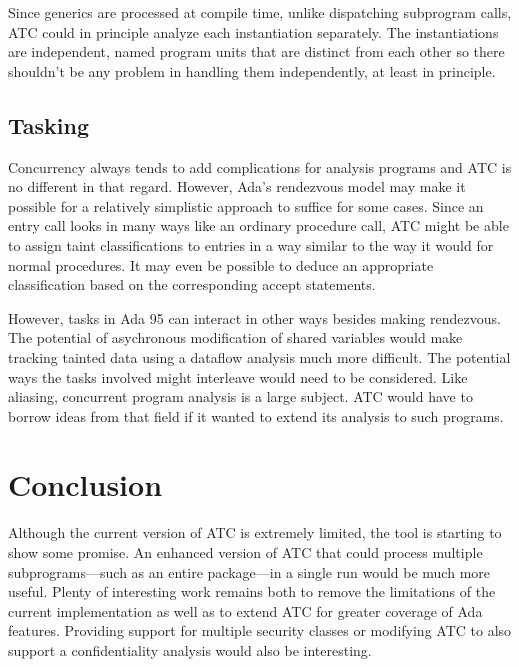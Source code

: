 \documentclass{article}
\begin{document}
Since generics are processed at compile time, unlike dispatching subprogram calls, ATC could in principle analyze each instantiation separately. The instantiations are independent, named program units that are distinct from each other so there shouldn't be any problem in handling them independently, at least in principle.

\subsection{Tasking}

Concurrency always tends to add complications for analysis programs and ATC is no different in that regard. However, Ada's rendezvous model may make it possible for a relatively simplistic approach to suffice for some cases. Since an entry call looks in many ways like an ordinary procedure call, ATC might be able to assign taint classifications to entries in a way similar to the way it would for normal procedures. It may even be possible to deduce an appropriate classification based on the corresponding accept statements.

However, tasks in Ada 95 can interact in other ways besides making rendezvous. The potential of asychronous modification of shared variables would make tracking tainted data using a dataflow analysis much more difficult. The potential ways the tasks involved might interleave would need to be considered. Like aliasing, concurrent program analysis is a large subject. ATC would have to borrow ideas from that field if it wanted to extend its analysis to such programs.

\section{Conclusion}

Although the current version of ATC is extremely limited, the tool is starting to show some promise. An enhanced version of ATC that could process multiple subprograms---such as an entire package---in a single run would be much more useful. Plenty of interesting work remains both to remove the limitations of the current implementation as well as to extend ATC for greater coverage of Ada features. Providing support for multiple security classes or modifying ATC to also support a confidentiality analysis would also be interesting.



\end{document}
